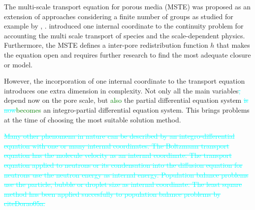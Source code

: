 \documentclass{CFD2011}
\newcommand{\newf}[1]{\textcolor{green}{#1}}
\newcommand{\nof}[1]{\textcolor{cyan}{{\sout{#1}}}}
\begin{document}
The multi-scale transport equation for porous media (MSTE) was proposed as an extension of approaches considering a finite number of groups as studied for example by \cite{Chen1989}, \cite{bouffard2001}. \cite{DupuySchwarz} introduced one internal coordinate to the continuity problem for accounting the multi scale transport of species and the scale-dependent physics. Furthermore, the MSTE defines a inter-pore redistribution function $h$ that makes the equation open and requires further research to find the most adequate closure or model.

However, the incorporation of one internal coordinate to the transport equation introduces one extra dimension in complexity. Not only all the main variables\nof{,} depend now on the pore scale, but \newf{also }the partial differential equation system \nof{is now}\newf{becomes} an integro-partial differential equation system. This brings problems at the time of choosing the most suitable solution method. 

\nof{Many other phenomena in nature can be described by an integro-differential equation with one or many internal coordinates. The Boltzmann transport equation has the molecule velocity as an internal coordinate. The transport equation applied to neutrons or its condensation into the diffusion equation for neutrons use the neutron energy as internal energy. Population balance problems use the particle, bubble or droplet size as internal coordinate. The least square method has been applied succesfully to population balance problems by cite{Dorao05a}.}

\end{document}

